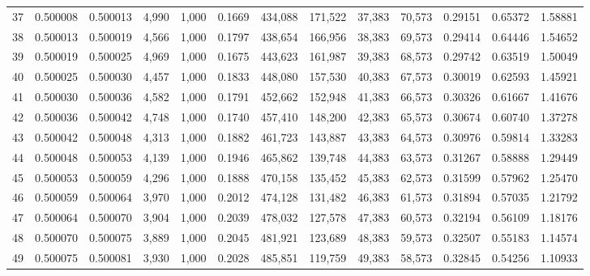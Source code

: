 \begin{tabular}{rrrrrrrrrrrrr}
37  &  0.500008 &  0.500013 &   4,990 &  1,000 &                                     0.1669 &  434,088 &  171,522 &   37,383 &   70,573 &  0.29151 &  0.65372 &  1.58881 \\
38  &  0.500013 &  0.500019 &   4,566 &  1,000 &                                     0.1797 &  438,654 &  166,956 &   38,383 &   69,573 &  0.29414 &  0.64446 &  1.54652 \\
39  &  0.500019 &  0.500025 &   4,969 &  1,000 &                                     0.1675 &  443,623 &  161,987 &   39,383 &   68,573 &  0.29742 &  0.63519 &  1.50049 \\
40  &  0.500025 &  0.500030 &   4,457 &  1,000 &                                     0.1833 &  448,080 &  157,530 &   40,383 &   67,573 &  0.30019 &  0.62593 &  1.45921 \\
41  &  0.500030 &  0.500036 &   4,582 &  1,000 &                                     0.1791 &  452,662 &  152,948 &   41,383 &   66,573 &  0.30326 &  0.61667 &  1.41676 \\
42  &  0.500036 &  0.500042 &   4,748 &  1,000 &                                     0.1740 &  457,410 &  148,200 &   42,383 &   65,573 &  0.30674 &  0.60740 &  1.37278 \\
43  &  0.500042 &  0.500048 &   4,313 &  1,000 &                                     0.1882 &  461,723 &  143,887 &   43,383 &   64,573 &  0.30976 &  0.59814 &  1.33283 \\
44  &  0.500048 &  0.500053 &   4,139 &  1,000 &                                     0.1946 &  465,862 &  139,748 &   44,383 &   63,573 &  0.31267 &  0.58888 &  1.29449 \\
45  &  0.500053 &  0.500059 &   4,296 &  1,000 &                                     0.1888 &  470,158 &  135,452 &   45,383 &   62,573 &  0.31599 &  0.57962 &  1.25470 \\
46  &  0.500059 &  0.500064 &   3,970 &  1,000 &                                     0.2012 &  474,128 &  131,482 &   46,383 &   61,573 &  0.31894 &  0.57035 &  1.21792 \\
47  &  0.500064 &  0.500070 &   3,904 &  1,000 &                                     0.2039 &  478,032 &  127,578 &   47,383 &   60,573 &  0.32194 &  0.56109 &  1.18176 \\
48  &  0.500070 &  0.500075 &   3,889 &  1,000 &                                     0.2045 &  481,921 &  123,689 &   48,383 &   59,573 &  0.32507 &  0.55183 &  1.14574 \\
49  &  0.500075 &  0.500081 &   3,930 &  1,000 &                                     0.2028 &  485,851 &  119,759 &   49,383 &   58,573 &  0.32845 &  0.54256 &  1.10933 \\

\end{tabular}
